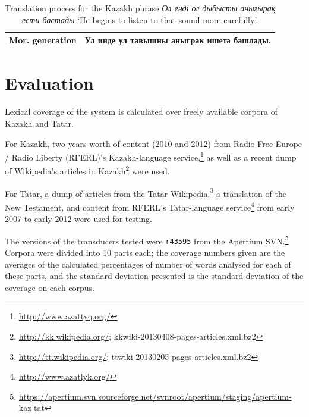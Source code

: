 \documentclass[a4paper,11pt]{article}
\newcommand{\tag}[1]{{\small{\texttt{#1}}}}
\newcommand{\eng}[1]{`#1'}
\begin{document}
\begin{table}[htbp]
\begin{tabular}{ll}
\midrule
{\bf Mor. generation} & Ул инде ул тавышны аныграк ишетә башлады. \\
\bottomrule
\end{tabular}
 \caption{Translation process for the Kazakh phrase \emph{Ол енді ол дыбысты анығырақ ести бастады} \eng{He begins to listen to that sound more carefully}.}
\end{table}

\section{Evaluation}
\label{sec:eval}

Lexical coverage of the system is calculated over freely available corpora of Kazakh and Tatar.

For Kazakh, two years worth of content (2010 and 2012) from Radio Free Europe / Radio Liberty (RFERL)'s Kazakh-language service,\footnote{\url{http://www.azattyq.org/}} as well as a recent dump of Wikipedia's articles in Kazakh\footnote{\url{http://kk.wikipedia.org/}; {\smallertt kkwiki-20130408-pages-articles.xml.bz2}} were used.

For Tatar, a dump of articles from the Tatar Wikipedia,\footnote{\url{http://tt.wikipedia.org/}; {\smallertt ttwiki-20130205-pages-articles.xml.bz2}} a translation of the New Testament, and content from RFERL's Tatar-language service\footnote{\url{http://www.azatlyk.org/}} from early 2007 to early 2012 were used for testing.

The versions of the transducers tested were {\tt {\small r43595}} from the Apertium SVN.\footnote{\url{https://apertium.svn.sourceforge.net/svnroot/apertium/staging/apertium-kaz-tat}}  Corpora were divided into 10 parts each; the coverage numbers given are the averages of the calculated percentages of number of words analysed for each of these parts, and the standard deviation presented is the standard deviation of the coverage on each corpus.
\end{document}
